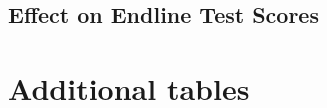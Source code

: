 \documentclass[11pt]{article}
\begin{document}
\begin{center}
{\renewcommand\normalsize{}\normalsize\singlespacing
} 
\end{center}

\begin{center}
{\renewcommand\normalsize{}\normalsize\singlespacing
} 
\end{center}


\clearpage
\subsection{Effect on Endline Test Scores}
\begin{center}
{\renewcommand\normalsize{}\normalsize\singlespacing
} 
\end{center}

\begin{center}
{\renewcommand\normalsize{}\normalsize\singlespacing
} 
\end{center}


\begin{center}
{\renewcommand\normalsize{}\normalsize\singlespacing
} 
\end{center}


\begin{center}
{\renewcommand\normalsize{}\normalsize\singlespacing
} 
\end{center}


\pagebreak
\appendix
\setcounter{table}{0}
\setcounter{figure}{0}
\renewcommand{\thetable}{A\arabic{table}}
\clearpage
\section{Additional tables}

\begin{center}
{\renewcommand\normalsize{}\normalsize\singlespacing\setlength{\tabcolsep}{10pt}
} 
\end{center}
\end{document}
